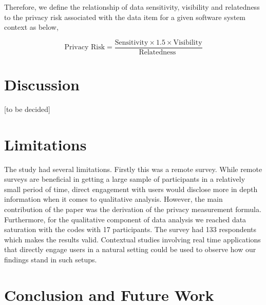 \documentclass[10pt]{article}
\begin{document}
Therefore, we define the relationship of data sensitivity, visibility and relatedness to the privacy risk associated with the data item for a given software system context as below,

\[ \text{Privacy Risk}  =
\frac{
      \text{Sensitivity} \times 1.5 \times \text{Visibility} }
 {
       \text{Relatedness }}
\]



\section{Discussion}

[to be decided]

\section {Limitations}

The study had several limitations. Firstly this was a remote survey. While remote surveys are beneficial in getting a large sample of participants in a relatively small period of time, direct engagement with users would disclose more in depth information when it comes to qualitative analysis. However, the main contribution of the paper was the derivation of the privacy measurement formula. Furthermore, for the qualitative component of data analysis we reached data saturation with the codes with 17 participants. The survey had 133 respondents which makes the results valid. Contextual studies involving real time applications that directly engage users in a natural setting could be used to observe how our findings stand in such setups.



\section{Conclusion and Future Work}





\end{document}
